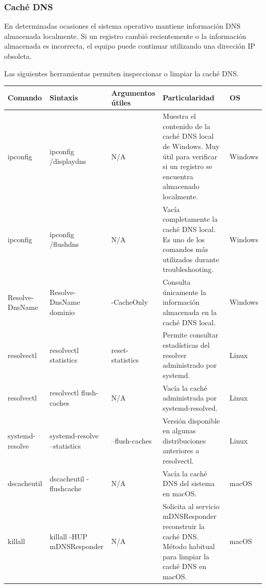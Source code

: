 \documentclass[a4paper,10pt]{article}
\begin{document}
\subsubsection{Caché DNS}

En determinadas ocasiones el sistema operativo mantiene información DNS
almacenada localmente. Si un registro cambió recientemente o la información
almacenada es incorrecta, el equipo puede continuar utilizando una dirección
IP obsoleta.

Las siguientes herramientas permiten inspeccionar o limpiar la caché DNS.

\begin{longtable}{|p{2.8cm}|p{3cm}|p{4cm}|p{5.6cm}|p{1.5cm}|}

\hline
Comando &
Sintaxis &
Argumentos útiles &
Particularidad &
OS
\\
\hline
\endhead

ipconfig &
ipconfig /displaydns &
N/A &
Muestra el contenido de la caché DNS local de Windows. Muy útil para verificar si un registro se encuentra almacenado localmente. &
Windows
\\
\hline

ipconfig &
ipconfig /flushdns &
N/A &
Vacía completamente la caché DNS local. Es uno de los comandos más utilizados durante troubleshooting. &
Windows
\\
\hline

Resolve-DnsName &
Resolve-DnsName dominio &
-CacheOnly &
Consulta únicamente la información almacenada en la caché DNS local. &
Windows
\\
\hline

resolvectl &
resolvectl statistics &
reset-statistics &
Permite consultar estadísticas del resolver administrado por systemd. &
Linux
\\
\hline

resolvectl &
resolvectl flush-caches &
N/A &
Vacía la caché administrada por systemd-resolved. &
Linux
\\
\hline

systemd-resolve &
systemd-resolve --statistics &
--flush-caches &
Versión disponible en algunas distribuciones anteriores a resolvectl. &
Linux
\\
\hline

dscacheutil &
dscacheutil -flushcache &
N/A &
Vacía la caché DNS del sistema en macOS. &
macOS
\\
\hline

killall &
killall -HUP mDNSResponder &
N/A &
Solicita al servicio mDNSResponder reconstruir la caché DNS. Método habitual para limpiar la caché DNS en macOS. &
macOS
\\
\hline

\end{longtable}
\end{document}
